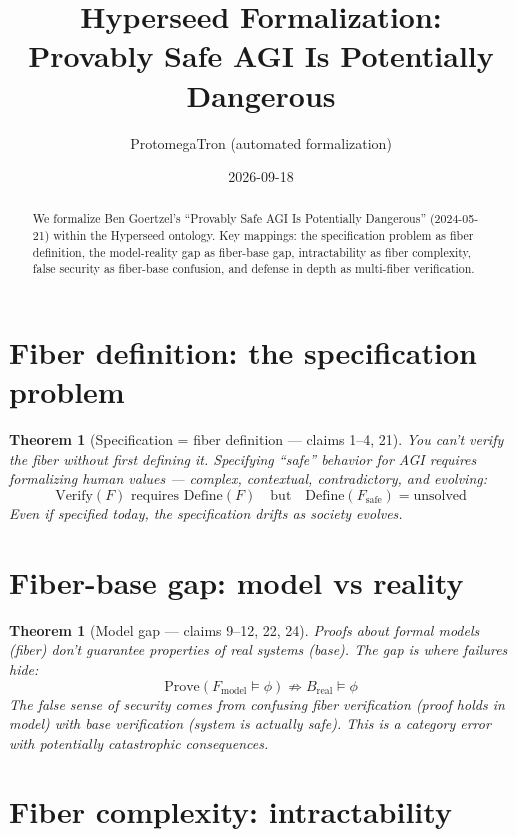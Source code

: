 \documentclass[11pt,a4paper]{article}
\title{Hyperseed Formalization:\\
  Provably Safe AGI Is Potentially Dangerous}
\author{ProtomegaTron (automated formalization)}
\date{2026-09-18}
\newtheorem{theorem}[definition]{Theorem}
\begin{document}
\maketitle

\begin{abstract}
We formalize Ben Goertzel's ``Provably Safe AGI Is Potentially Dangerous''
(2024-05-21) within the Hyperseed ontology. Key mappings: the specification
problem as fiber definition, the model-reality gap as fiber-base gap,
intractability as fiber complexity, false security as fiber-base confusion,
and defense in depth as multi-fiber verification.
\end{abstract}

\tableofcontents

\section{Fiber definition: the specification problem}

\begin{theorem}[Specification = fiber definition --- claims 1--4, 21]
You can't verify the fiber without first defining it. Specifying ``safe''
behavior for AGI requires formalizing human values --- complex, contextual,
contradictory, and evolving:
\[
  \text{Verify}(F) \text{ requires } \text{Define}(F)
  \quad \text{but} \quad \text{Define}(F_{\text{safe}}) = \text{unsolved}
\]
Even if specified today, the specification drifts as society evolves.
\end{theorem}

\section{Fiber-base gap: model vs reality}

\begin{theorem}[Model gap --- claims 9--12, 22, 24]
Proofs about formal models (fiber) don't guarantee properties of real
systems (base). The gap is where failures hide:
\[
  \text{Prove}(F_{\text{model}} \models \phi) \not\Rightarrow
  B_{\text{real}} \models \phi
\]
The false sense of security comes from confusing fiber verification
(proof holds in model) with base verification (system is actually safe).
This is a category error with potentially catastrophic consequences.
\end{theorem}

\section{Fiber complexity: intractability}
\end{document}
